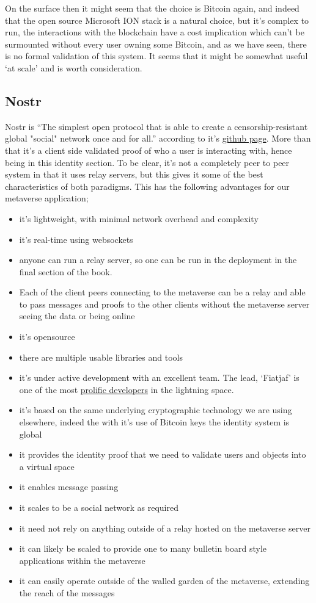 On the surface then it might seem that the choice is Bitcoin again, and indeed that the open source Microsoft ION stack is a natural choice, but it's complex to run, the interactions with the blockchain have a cost implication which can't be surmounted without every user owning some Bitcoin, and as we have seen, there is no formal validation of this system. It seems that it might be somewhat useful `at scale' and is worth consideration.
\subsection{Nostr}
Nostr is ``The simplest open protocol that is able to create a censorship-resistant global "social" network once and for all.'' according to it's \href{https://github.com/fiatjaf/nostr}{github page}. More than that it's a client side validated proof of who a user is interacting with, hence being in this identity section. To be clear, it's not a completely peer to peer system in that it uses relay servers, but this gives it some of the best characteristics of both paradigms. This has the following advantages for our metaverse application; 
\begin{itemize}
\item it's lightweight, with minimal network overhead and complexity
\item it's real-time using websockets
\item anyone can run a relay server, so one can be run in the deployment in the final section of the book.
\item Each of the client peers connecting to the metaverse can be a relay and able to pass messages and proofs to the other clients without the metaverse server seeing the data or being online 
\item it's opensource
\item there are multiple usable libraries and tools
\item it's under active development with an excellent team. The lead, `Fiatjaf' is one of the most \href{https://github.com/fiatjaf}{prolific developers} in the lightning space.
\item it's based on the same underlying cryptographic technology we are using elsewhere, indeed the with it's use of Bitcoin keys the identity system is global
\item it provides the identity proof that we need to validate users and objects into a virtual space
\item it enables message passing
\item it scales to be a social network as required
\item it need not rely on anything outside of a relay hosted on the metaverse server
\item it can likely be scaled to provide one to many bulletin board style applications within the metaverse
\item it can easily operate outside of the walled garden of the metaverse, extending the reach of the messages
\end{itemize} 
